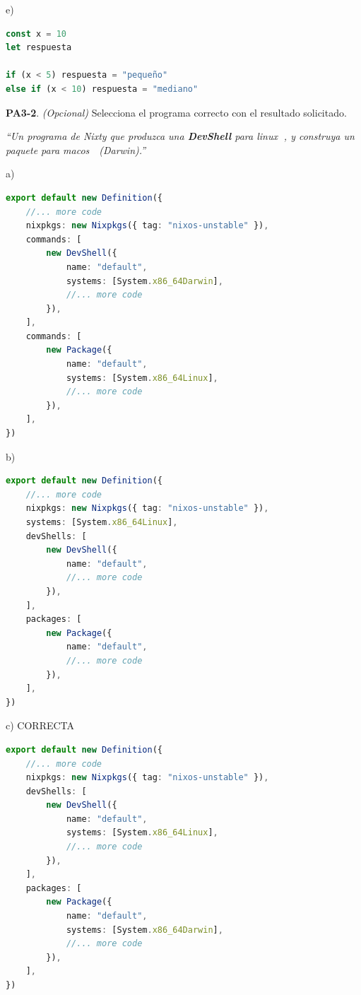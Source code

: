 \begin{opcion}{e)}
\begin{lstlisting}[language=TypeScript]
const x = 10
let respuesta

if (x < 5) respuesta = "pequeño"
else if (x < 10) respuesta = "mediano"
\end{lstlisting}
\end{opcion}

\textbf{PA3-2}. \emph{(Opcional)} Selecciona el programa correcto con el resultado solicitado.

\emph{``Un programa de Nixty que produzca una \textbf{DevShell} para linux 🐧, y construya un paquete para macos 🍎 (Darwin).''}

\begin{opcion}{a)}
\begin{lstlisting}[language=TypeScript]
export default new Definition({
    //... more code
    nixpkgs: new Nixpkgs({ tag: "nixos-unstable" }),
    commands: [
        new DevShell({
            name: "default",
            systems: [System.x86_64Darwin],
            //... more code
        }),
    ],
    commands: [
        new Package({
            name: "default",
            systems: [System.x86_64Linux],
            //... more code
        }),
    ],
})
\end{lstlisting}
\end{opcion}

\begin{opcion}{b)}
\begin{lstlisting}[language=TypeScript]
export default new Definition({
    //... more code
    nixpkgs: new Nixpkgs({ tag: "nixos-unstable" }),
    systems: [System.x86_64Linux],
    devShells: [
        new DevShell({
            name: "default",
            //... more code
        }),
    ],
    packages: [
        new Package({
            name: "default",
            //... more code
        }),
    ],
})
\end{lstlisting}
\end{opcion}

\begin{opcion}{c)}
CORRECTA
\begin{lstlisting}[language=TypeScript]
export default new Definition({
    //... more code
    nixpkgs: new Nixpkgs({ tag: "nixos-unstable" }),
    devShells: [
        new DevShell({
            name: "default",
            systems: [System.x86_64Linux],
            //... more code
        }),
    ],
    packages: [
        new Package({
            name: "default",
            systems: [System.x86_64Darwin],
            //... more code
        }),
    ],
})
\end{lstlisting}
\end{opcion}

